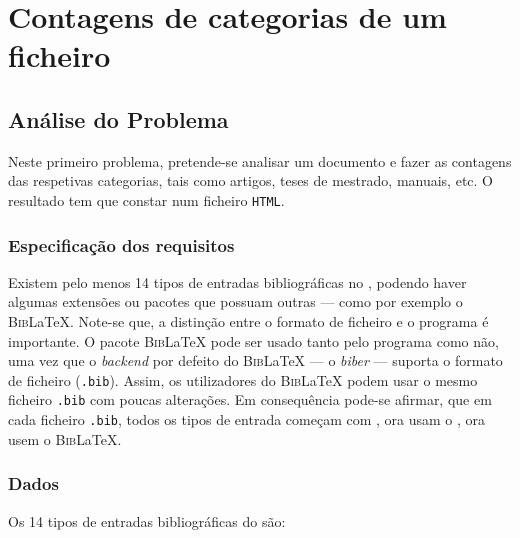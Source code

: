 \chapter{Contagens de categorias de um ficheiro }
\label{chap:a}

\section{Análise do Problema}
Neste primeiro problema, pretende-se analisar um documento  e fazer as
contagens das respetivas categorias, tais como artigos, teses de mestrado,
manuais, etc. O resultado tem que constar num ficheiro \texttt{HTML}.
\label{sec:ap:a}

\subsection{Especificação dos requisitos}
\label{sec:spec:a}
Existem pelo menos 14 tipos de entradas bibliográficas no ,
podendo haver algumas extensões ou pacotes que possuam outras --- como por exemplo
o \textsc{Bib}\LaTeX{}.
Note-se que, a distinção entre o formato de ficheiro 
e o programa  é importante. O pacote \textsc{Bib}\LaTeX{} pode
ser usado tanto pelo programa  como não, uma vez que
o \emph{backend} por defeito do \textsc{Bib}\LaTeX{} --- o \emph{biber} ---
suporta o formato de ficheiro  (\texttt{.bib}). Assim, os
utilizadores do \textsc{Bib}\LaTeX{} podem usar o mesmo ficheiro \texttt{.bib} com
poucas alterações. Em consequência pode-se afirmar, que em cada ficheiro
\texttt{.bib}, todos os tipos de entrada começam com \emph{\@}, ora usam
o , ora usem o \textsc{Bib}\LaTeX.


\subsection{Dados}

Os 14 tipos de entradas bibliográficas do  são:

